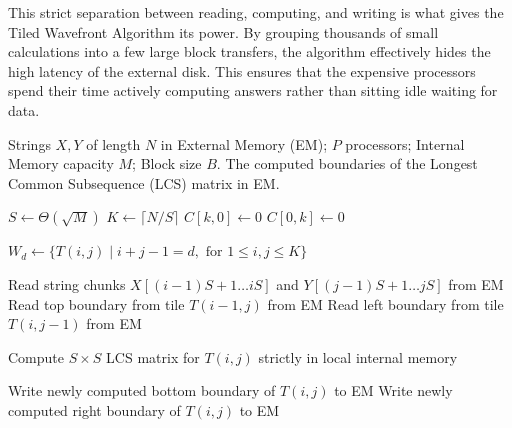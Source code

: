 This strict separation between reading, computing, and writing is what gives the Tiled Wavefront Algorithm its power. By grouping thousands of small calculations into a few large block transfers, the algorithm effectively hides the high latency of the external disk. This ensures that the expensive processors spend their time actively computing answers rather than sitting idle waiting for data.


\begin{algorithm}[H]

    \caption{Tiled Wavefront LCS on the PEM Model}
    \label{alg:tiled_wavefront}
    \begin{algorithmic}[1]
    \Require Strings $X, Y$ of length $N$ in External Memory (EM); $P$ processors; Internal Memory capacity $M$; Block size $B$.
    \Ensure The computed boundaries of the Longest Common Subsequence (LCS) matrix in EM.

\Statex {}
\State $S \gets \Theta(\sqrt{M})$ 
\State $K \gets \lceil N/S \rceil$ 
    \State $C[k, 0] \gets 0$
    \State $C[0, k] \gets 0$ 
\EndFor

\Statex {}
 
    \State $W_d \gets \{ T(i,j) \mid i + j - 1 = d, \text{ for } 1 \le i, j \le K \}$
    
    \Statex \hspace{0.5cm}
        
        \Statex \hspace{1cm}
        \State Read string chunks $X[(i-1)S+1 \dots iS]$ and $Y[(j-1)S+1 \dots jS]$ from EM
        \State Read top boundary from tile $T(i-1, j)$ from EM
        \State Read left boundary from tile $T(i, j-1)$ from EM
        
        \Statex \hspace{1cm}
        \State Compute $S \times S$ LCS matrix for $T(i,j)$ strictly in local internal memory
        
        \Statex \hspace{1cm}
        \State Write newly computed bottom boundary of $T(i,j)$ to EM
        \State Write newly computed right boundary of $T(i,j)$ to EM
    \EndFor
\EndFor
        
    \end{algorithmic}
\end{algorithm}



